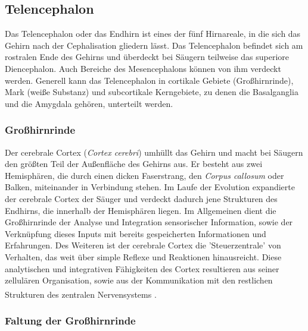 
\subsection{Telencephalon}
\label{subsec:Telencephalon} 

Das Telencephalon oder das Endhirn ist eines der fünf Hirnareale, in die sich das Gehirn nach der Cephalisation gliedern lässt. Das Telencephalon befindet sich am rostralen Ende des Gehirns und überdeckt bei Säugern teilweise das superiore Diencephalon. Auch Bereiche des Mesencephalons können von ihm verdeckt werden. Generell kann das Telencephalon in cortikale Gebiete (Großhirnrinde), Mark (weiße Substanz) und subcortikale Kerngebiete, zu denen die Basalganglia und die Amygdala gehören, unterteilt werden. 

\subsubsection{Großhirnrinde}
\label{subsubsec:Grosshirnrinde}

Der cerebrale Cortex (\textit{Cortex cerebri})  umhüllt das Gehirn und macht bei Säugern den größten Teil der Außenfläche des Gehirns aus. Er besteht aus zwei Hemisphären, die durch einen dicken Faserstrang, den \textit{Corpus callosum}  oder Balken, miteinander in Verbindung stehen. Im Laufe der Evolution expandierte der cerebrale Cortex der Säuger und verdeckt dadurch jene Strukturen des Endhirns, die innerhalb der Hemisphären liegen. Im Allgemeinen dient die Großhirnrinde der Analyse und Integration sensorischer Information, sowie der Verknüpfung  dieses Inputs mit bereits gespeicherten Informationen und Erfahrungen. Des Weiteren ist der cerebrale Cortex die 'Steuerzentrale' von Verhalten, das weit über simple Reflexe und Reaktionen hinausreicht. Diese analytischen und integrativen Fähigkeiten des Cortex resultieren aus seiner zellulären Organisation, sowie aus der Kommunikation mit den restlichen Strukturen des zentralen Nervensystems \textsuperscript{\cite[Kap.~7]{watson2010thebrain}}.


\subsubsection*{Faltung der Großhirnrinde}

